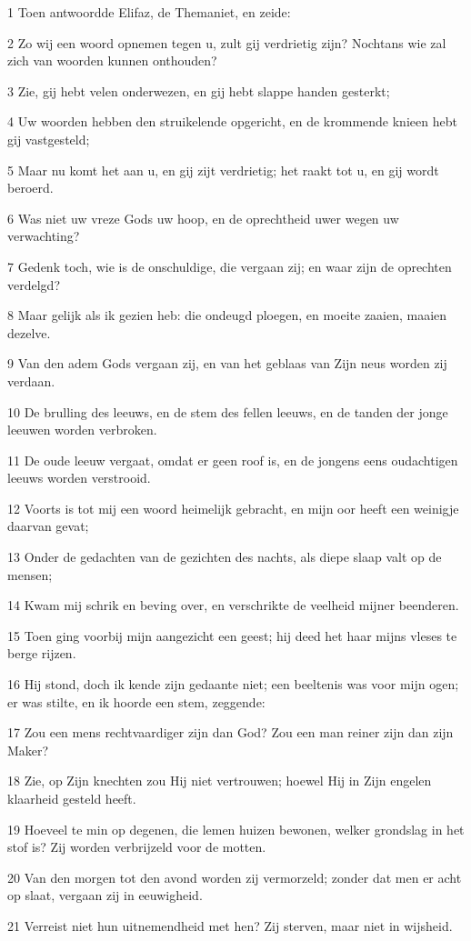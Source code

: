 \par 1 Toen antwoordde Elifaz, de Themaniet, en zeide:
\par 2 Zo wij een woord opnemen tegen u, zult gij verdrietig zijn? Nochtans wie zal zich van woorden kunnen onthouden?
\par 3 Zie, gij hebt velen onderwezen, en gij hebt slappe handen gesterkt;
\par 4 Uw woorden hebben den struikelende opgericht, en de krommende knieen hebt gij vastgesteld;
\par 5 Maar nu komt het aan u, en gij zijt verdrietig; het raakt tot u, en gij wordt beroerd.
\par 6 Was niet uw vreze Gods uw hoop, en de oprechtheid uwer wegen uw verwachting?
\par 7 Gedenk toch, wie is de onschuldige, die vergaan zij; en waar zijn de oprechten verdelgd?
\par 8 Maar gelijk als ik gezien heb: die ondeugd ploegen, en moeite zaaien, maaien dezelve.
\par 9 Van den adem Gods vergaan zij, en van het geblaas van Zijn neus worden zij verdaan.
\par 10 De brulling des leeuws, en de stem des fellen leeuws, en de tanden der jonge leeuwen worden verbroken.
\par 11 De oude leeuw vergaat, omdat er geen roof is, en de jongens eens oudachtigen leeuws worden verstrooid.
\par 12 Voorts is tot mij een woord heimelijk gebracht, en mijn oor heeft een weinigje daarvan gevat;
\par 13 Onder de gedachten van de gezichten des nachts, als diepe slaap valt op de mensen;
\par 14 Kwam mij schrik en beving over, en verschrikte de veelheid mijner beenderen.
\par 15 Toen ging voorbij mijn aangezicht een geest; hij deed het haar mijns vleses te berge rijzen.
\par 16 Hij stond, doch ik kende zijn gedaante niet; een beeltenis was voor mijn ogen; er was stilte, en ik hoorde een stem, zeggende:
\par 17 Zou een mens rechtvaardiger zijn dan God? Zou een man reiner zijn dan zijn Maker?
\par 18 Zie, op Zijn knechten zou Hij niet vertrouwen; hoewel Hij in Zijn engelen klaarheid gesteld heeft.
\par 19 Hoeveel te min op degenen, die lemen huizen bewonen, welker grondslag in het stof is? Zij worden verbrijzeld voor de motten.
\par 20 Van den morgen tot den avond worden zij vermorzeld; zonder dat men er acht op slaat, vergaan zij in eeuwigheid.
\par 21 Verreist niet hun uitnemendheid met hen? Zij sterven, maar niet in wijsheid.

